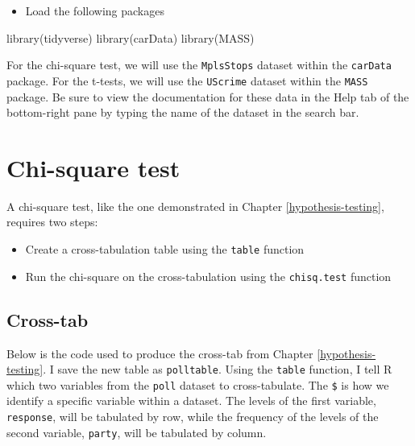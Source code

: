 \documentclass[
]{book}
\makeatletter
\newenvironment{Shaded}{\begin{snugshade}}{\end{snugshade}}
\newcommand{\FunctionTok}[1]{\textcolor[rgb]{0,0,0}{#1}}
\newcommand{\NormalTok}[1]{#1}
\providecommand{\tightlist}{%
  \setlength{\itemsep}{0pt}\setlength{\parskip}{0pt}}
\newenvironment{kframe}{%
\medskip{}
\setlength{\fboxsep}{.8em}
 \def\at@end@of@kframe{}%
 \ifinner\ifhmode%
  \def\at@end@of@kframe{\end{minipage}}%
  \begin{minipage}{\columnwidth}%
 \fi\fi%
 \def\FrameCommand##1{\hskip\@totalleftmargin \hskip-\fboxsep
 \colorbox{shadecolor}{##1}\hskip-\fboxsep
     \hskip-\linewidth \hskip-\@totalleftmargin \hskip\columnwidth}%
 \MakeFramed {\advance\hsize-\width
   \@totalleftmargin\z@ \linewidth\hsize
   \@setminipage}}%
 {\par\unskip\endMakeFramed%
 \at@end@of@kframe}
\renewenvironment{Shaded}{\begin{kframe}}{\end{kframe}}
\makeatother
\begin{document}
\begin{itemize}
\tightlist
\item
  Load the following packages
\end{itemize}

\begin{Shaded}
\begin{Highlighting}[]
\FunctionTok{library}\NormalTok{(tidyverse)}
\FunctionTok{library}\NormalTok{(carData)}
\FunctionTok{library}\NormalTok{(MASS)}
\end{Highlighting}
\end{Shaded}

For the chi-square test, we will use the \texttt{MplsStops} dataset within the \texttt{carData} package. For the t-tests, we will use the \texttt{UScrime} dataset within the \texttt{MASS} package. Be sure to view the documentation for these data in the Help tab of the bottom-right pane by typing the name of the dataset in the search bar.

\hypertarget{chi-square-test}{%
\section{Chi-square test}\label{chi-square-test}}

A chi-square test, like the one demonstrated in Chapter \ref{hypothesis-testing}, requires two steps:

\begin{itemize}
\tightlist
\item
  Create a cross-tabulation table using the \texttt{table} function
\item
  Run the chi-square on the cross-tabulation using the \texttt{chisq.test} function
\end{itemize}

\hypertarget{cross-tab}{%
\subsection{Cross-tab}\label{cross-tab}}

Below is the code used to produce the cross-tab from Chapter \ref{hypothesis-testing}. I save the new table as \texttt{polltable}. Using the \texttt{table} function, I tell R which two variables from the \texttt{poll} dataset to cross-tabulate. The \texttt{\$} is how we identify a specific variable within a dataset. The levels of the first variable, \texttt{response}, will be tabulated by row, while the frequency of the levels of the second variable, \texttt{party}, will be tabulated by column.
\end{document}
